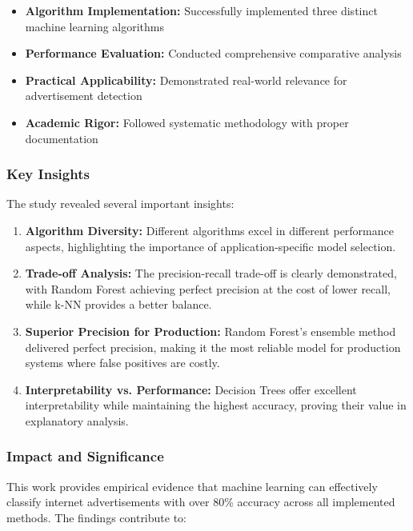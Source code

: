 \begin{itemize}
    \item \textbf{Algorithm Implementation:} Successfully implemented three distinct machine learning algorithms
    \item \textbf{Performance Evaluation:} Conducted comprehensive comparative analysis
    \item \textbf{Practical Applicability:} Demonstrated real-world relevance for advertisement detection
    \item \textbf{Academic Rigor:} Followed systematic methodology with proper documentation
\end{itemize}

\subsubsection{Key Insights}

The study revealed several important insights:

\begin{enumerate}
    \item \textbf{Algorithm Diversity:} Different algorithms excel in different performance aspects, highlighting the importance of application-specific model selection.
    
    \item \textbf{Trade-off Analysis:} The precision-recall trade-off is clearly demonstrated, with Random Forest achieving perfect precision at the cost of lower recall, while k-NN provides a better balance.
    
    \item \textbf{Superior Precision for Production:} Random Forest's ensemble method delivered perfect precision, making it the most reliable model for production systems where false positives are costly.
    
    \item \textbf{Interpretability vs. Performance:} Decision Trees offer excellent interpretability while maintaining the highest accuracy, proving their value in explanatory analysis.
\end{enumerate}

\subsubsection{Impact and Significance}

This work provides empirical evidence that machine learning can effectively classify internet advertisements with over 80\% accuracy across all implemented methods. The findings contribute to:

